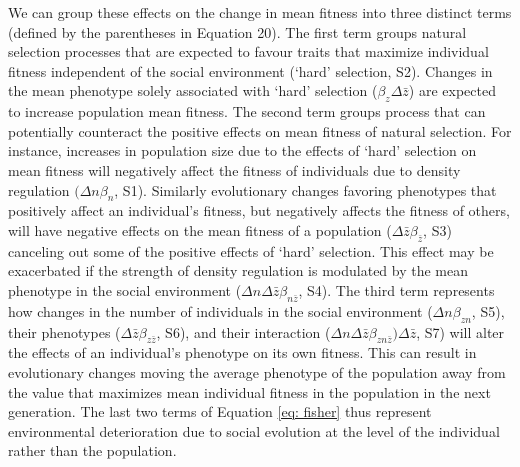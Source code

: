 \documentclass{article}
\begin{document}
We can group these effects on the change in mean fitness into three distinct terms (defined by the parentheses in Equation 20). The first term groups natural selection processes that are expected to favour traits that maximize individual fitness independent of the social environment (`hard' selection, S2). Changes in the mean phenotype solely associated with `hard' selection ($\beta_{z}\Delta \bar{z}$) are expected to increase population mean fitness. The second term groups process that can potentially counteract the positive effects on mean fitness of natural selection. For instance, increases in population size due to the effects of `hard' selection on mean fitness will negatively affect the fitness of individuals due to density regulation $(\Delta n\beta_{n}$, S1). Similarly evolutionary changes favoring phenotypes that positively affect an individual's fitness, but negatively affects the fitness of others, will have negative effects on the mean fitness of a population ($\Delta \bar{z} \beta_{\bar{z}}$, S3) canceling out some of the positive effects of `hard' selection. This effect may be exacerbated if the strength of density regulation is modulated by the mean phenotype in the social environment ($\Delta n \Delta \bar{z} \beta_{n\bar{z}}$, S4). The third term represents how changes in the number of individuals in the social environment ($\Delta n  \beta_{zn}$, S5), their phenotypes ($\Delta \bar{z} \beta_{z\bar{z}}$, S6), and their interaction ($\Delta n \Delta\bar{z} \beta_{zn\bar{z}})\Delta \bar{z}$, S7) will alter the effects of an individual's phenotype on its own fitness. This can result in evolutionary changes moving the average phenotype of the population away from the value that maximizes mean individual fitness in the population in the next generation. The last two terms of Equation \ref{eq: fisher} thus represent environmental deterioration due to social evolution at the level of the individual rather than the population.
\end{document}
